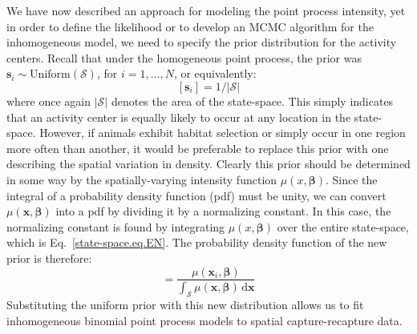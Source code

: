 We have now described an approach for modeling the point process
intensity, yet in order to define the likelihood or to develop an MCMC
algorithm for the inhomogeneous model, we need to specify the prior
distribution for the activity centers. Recall that under the
homogeneous point process, the prior was
$\mathbf{s}_i \sim \text{Uniform}(\mathcal{S})$, for $i=1,\dots,N$, or
equivalently:
\begin{equation}
  \label{state-space.eq.uprior}
  [\mathbf{s}_i] = 1/|\mathcal{S}|
\end{equation}
where once again $|\mathcal{S}|$ denotes the area of the
state-space. This simply indicates that an activity center is equally
likely to occur at any location in the state-space.
However, if animals exhibit habitat selection or simply
occur in one region more often than another, it would be preferable to
replace this prior with one describing the spatial variation in
density. Clearly this prior should be determined in some way by the
spatially-varying intensity function $\mu(x, \bm{\beta})$.
Since
the integral of a probability density function (pdf) must be unity,
we can convert $\mu(\mathbf{x}, \bm{\beta})$ into a pdf by dividing it by a
normalizing constant. In this case, the normalizing constant is found by integrating
$\mu(x, \bm{\beta})$ over the entire state-space, which is Eq.~\ref{state-space.eq.EN}.
The probability density function of the new prior is therefore:
\begin{equation}
[\mathbf{s}_i | \bm{\beta}] = \frac{\mu(\mathbf{x}_i, \bm{\beta})}{\int_{\mathcal{S}} \mu(\mathbf{x}, \bm{\beta})\, \mathrm{d}\mathbf{x}}
\label{state-space.eq.pdf.hetero}
\end{equation}
Substituting the uniform prior with this new distribution
allows us to fit inhomogeneous binomial point process
models to spatial capture-recapture data.

